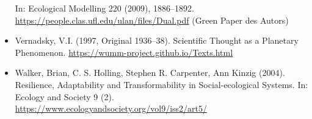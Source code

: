 \documentclass[11pt,a4paper]{article}
\begin{document}
\begin{itemize}
  In: Ecological Modelling 220 (2009), 1886–1892.\\
  \url{https://people.clas.ufl.edu/ulan/files/Dual.pdf} (Green Paper des
  Autors) 
\item Vernadsky, V.I. (1997, Original 1936--38). Scientific Thought as a
  Planetary Phenomenon. \url{https://wumm-project.github.io/Texts.html}
\item Walker, Brian, C. S. Holling, Stephen R. Carpenter, Ann Kinzig (2004).
  Resilience, Adaptability and Transformability in Social-ecological Systems. 
  In: Ecology and Society 9 (2).
  \url{https://www.ecologyandsociety.org/vol9/iss2/art5/}
\end{itemize}
\end{document}
